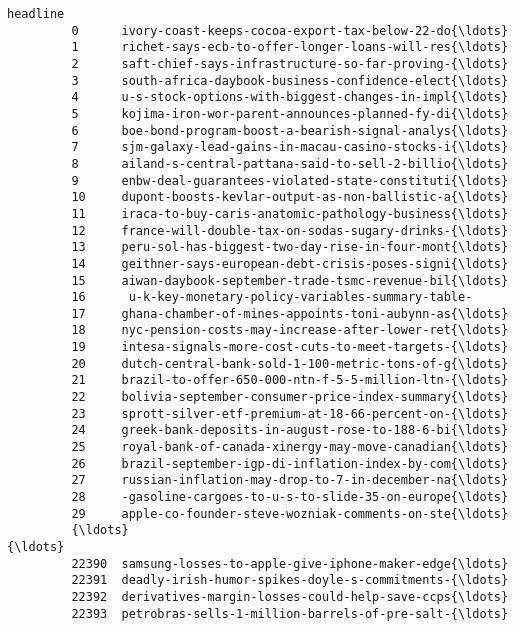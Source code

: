 \documentclass[11pt]{article}
\begin{document}
\begin{Verbatim}[commandchars=\\\{\}]
                                                         headline  
         0      ivory-coast-keeps-cocoa-export-tax-below-22-do{\ldots}  
         1      richet-says-ecb-to-offer-longer-loans-will-res{\ldots}  
         2      saft-chief-says-infrastructure-so-far-proving-{\ldots}  
         3      south-africa-daybook-business-confidence-elect{\ldots}  
         4      u-s-stock-options-with-biggest-changes-in-impl{\ldots}  
         5      kojima-iron-wor-parent-announces-planned-fy-di{\ldots}  
         6      boe-bond-program-boost-a-bearish-signal-analys{\ldots}  
         7      sjm-galaxy-lead-gains-in-macau-casino-stocks-i{\ldots}  
         8      ailand-s-central-pattana-said-to-sell-2-billio{\ldots}  
         9      enbw-deal-guarantees-violated-state-constituti{\ldots}  
         10     dupont-boosts-kevlar-output-as-non-ballistic-a{\ldots}  
         11     iraca-to-buy-caris-anatomic-pathology-business{\ldots}  
         12     france-will-double-tax-on-sodas-sugary-drinks-{\ldots}  
         13     peru-sol-has-biggest-two-day-rise-in-four-mont{\ldots}  
         14     geithner-says-european-debt-crisis-poses-signi{\ldots}  
         15     aiwan-daybook-september-trade-tsmc-revenue-bil{\ldots}  
         16      u-k-key-monetary-policy-variables-summary-table-  
         17     ghana-chamber-of-mines-appoints-toni-aubynn-as{\ldots}  
         18     nyc-pension-costs-may-increase-after-lower-ret{\ldots}  
         19     intesa-signals-more-cost-cuts-to-meet-targets-{\ldots}  
         20     dutch-central-bank-sold-1-100-metric-tons-of-g{\ldots}  
         21     brazil-to-offer-650-000-ntn-f-5-5-million-ltn-{\ldots}  
         22     bolivia-september-consumer-price-index-summary{\ldots}  
         23     sprott-silver-etf-premium-at-18-66-percent-on-{\ldots}  
         24     greek-bank-deposits-in-august-rose-to-188-6-bi{\ldots}  
         25     royal-bank-of-canada-xinergy-may-move-canadian{\ldots}  
         26     brazil-september-igp-di-inflation-index-by-com{\ldots}  
         27     russian-inflation-may-drop-to-7-in-december-na{\ldots}  
         28     -gasoline-cargoes-to-u-s-to-slide-35-on-europe{\ldots}  
         29     apple-co-founder-steve-wozniak-comments-on-ste{\ldots}  
         {\ldots}                                                  {\ldots}  
         22390  samsung-losses-to-apple-give-iphone-maker-edge{\ldots}  
         22391  deadly-irish-humor-spikes-doyle-s-commitments-{\ldots}  
         22392  derivatives-margin-losses-could-help-save-ccps{\ldots}  
         22393  petrobras-sells-1-million-barrels-of-pre-salt-{\ldots}  

\end{Verbatim}
\end{document}
